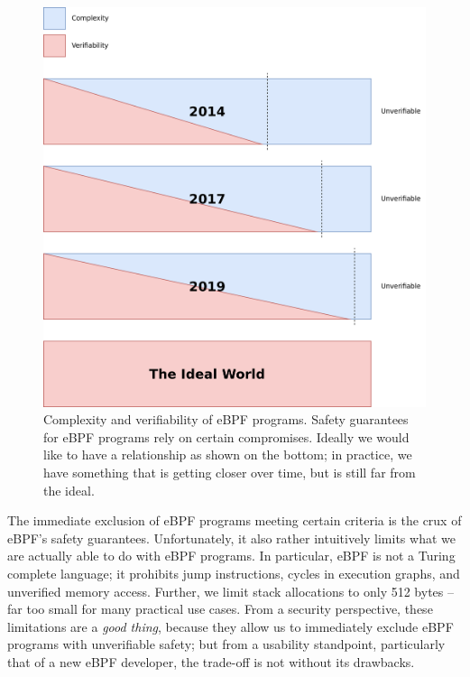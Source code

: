 \documentclass[
  12pt]{findlay}
\begin{document}
\begin{figure}
\begin{center}
\includegraphics{../figures/complexity-verifiability.png}
\end{center}
\caption[Complexity and verifiability of eBPF programs.]
{
Complexity and verifiability of eBPF programs.
Safety guarantees for eBPF programs rely on certain compromises.
Ideally we would like to have a relationship as shown on the bottom;
in practice, we have something that is getting closer over time, but is still
far from the ideal.
}
\label{complexity-verifiability}
\end{figure}

The immediate exclusion of eBPF programs meeting certain criteria is the
crux of eBPF's safety guarantees. Unfortunately, it also rather
intuitively limits what we are actually able to do with eBPF programs.
In particular, eBPF is not a Turing complete language; it prohibits jump
instructions, cycles in execution graphs, and unverified memory access.
Further, we limit stack allocations to only 512 bytes -- far too small
for many practical use cases. From a security perspective, these
limitations are a \emph{good thing}, because they allow us to
immediately exclude eBPF programs with unverifiable safety; but from a
usability standpoint, particularly that of a new eBPF developer, the
trade-off is not without its drawbacks.
\end{document}
